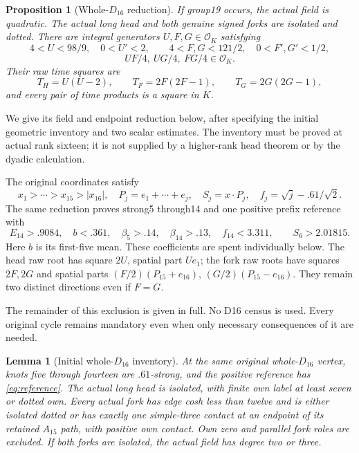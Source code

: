 \documentclass[11pt]{article}
\newtheorem{proposition}[theorem]{Proposition}
\newtheorem{lemma}[theorem]{Lemma}
\newcommand{\OK}{\mathcal O_K}
\begin{document}
\begin{proposition}[Whole-$D_{16}$ reduction]\label{prop:d16reduce}
If group19 occurs, the actual field is quadratic. The actual long
head and both genuine signed forks are isolated and dotted. There
are integral generators $U,F,G\in\OK$ satisfying
\begin{equation}\label{eq:d16strips}
 4<U<98/9,\quad0<U'<2,\qquad
 4<F,G<121/2,\quad0<F',G'<1/2,
\end{equation}
\begin{equation}\label{eq:quarters}
 UF/4,\ UG/4,\ FG/4\in\OK.
\end{equation}
Their raw time squares are
\begin{equation}\label{eq:times}
 T_H=U(U-2),\qquad T_F=2F(2F-1),\qquad T_G=2G(2G-1),
\end{equation}
and every pair of time products is a square in $K$.
\end{proposition}

We give its field and endpoint reduction below, after specifying the
initial geometric inventory and two scalar estimates. The inventory
must be proved at actual rank sixteen; it is not supplied by a
higher-rank head theorem or by the dyadic calculation.

The original coordinates satisfy
\[
 x_1>\cdots>x_{15}>|x_{16}|,\quad P_j=e_1+\cdots+e_j,\quad
 S_j=x\cdot P_j,\quad f_j=\sqrt j-.61/\sqrt2.
\]
The same reduction proves strong5 through14 and one positive prefix
reference with
\begin{equation}\label{eq:reference}
 E_{14}>.9084,\quad b<.361,\quad
 \beta_5>.14,\quad\beta_{14}>.13,\quad f_{14}<3.311,
 \qquad S_6>2.01815.
\end{equation}
Here $b$ is its first-five mean. These coefficients are spent
individually below. The head raw root has square $2U$, spatial
part $Ue_1$; the fork raw roots have squares $2F,2G$ and spatial
parts $(F/2)(P_{15}+e_{16})$, $(G/2)(P_{15}-e_{16})$.
They remain two distinct directions even if $F=G$.

The remainder of this exclusion is given in full. No D16 census is
used. Every original cycle remains mandatory even when only necessary
consequences of it are needed.

\begin{lemma}[Initial whole-$D_{16}$ inventory]\label{lem:D16initial}
At the same original whole-$D_{16}$ vertex, knots five through fourteen
are $.61$-strong, and the positive reference has
\eqref{eq:reference}. The actual long head is isolated, with finite
own label at least seven or dotted own. Every actual fork has edge
cosh less than twelve and is either isolated dotted or has exactly
one simple-three contact at an endpoint of its retained $A_{15}$ path,
with positive own contact. Own zero and parallel fork roles are excluded.
If both forks are isolated, the actual field has degree two or three.
\end{lemma}
\end{document}
